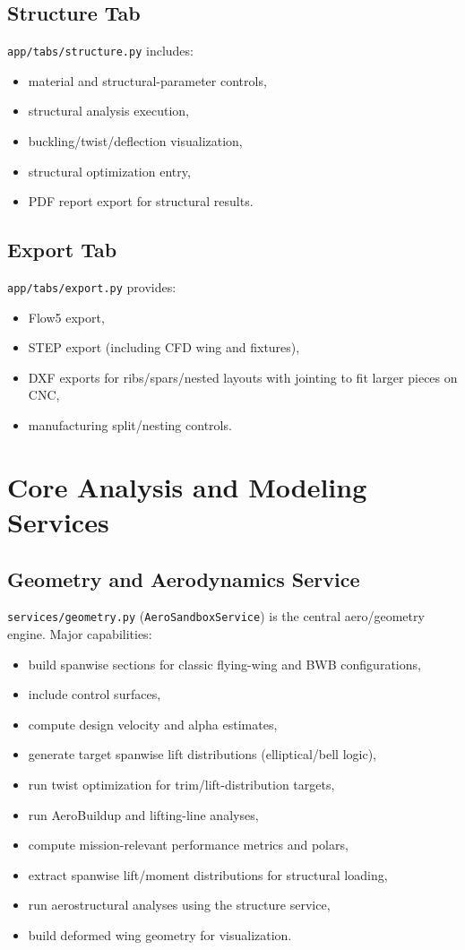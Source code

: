 ﻿\documentclass[11pt]{article}
\begin{document}
\subsection{Structure Tab}
\texttt{app/tabs/structure.py} includes:
\begin{itemize}
\item material and structural-parameter controls,
\item structural analysis execution,
\item buckling/twist/deflection visualization,
\item structural optimization entry,
\item PDF report export for structural results.
\end{itemize}

\subsection{Export Tab}
\texttt{app/tabs/export.py} provides:
\begin{itemize}
\item Flow5 export,
\item STEP export (including CFD wing and fixtures),
\item DXF exports for ribs/spars/nested layouts with jointing to fit larger pieces on CNC,
\item manufacturing split/nesting controls.
\end{itemize}

\section{Core Analysis and Modeling Services}
\subsection{Geometry and Aerodynamics Service}
\texttt{services/geometry.py} (\texttt{AeroSandboxService}) is the central aero/geometry engine. Major capabilities:
\begin{itemize}
\item build spanwise sections for classic flying-wing and BWB configurations,
\item include control surfaces,
\item compute design velocity and alpha estimates,
\item generate target spanwise lift distributions (elliptical/bell logic),
\item run twist optimization for trim/lift-distribution targets,
\item run AeroBuildup and lifting-line analyses,
\item compute mission-relevant performance metrics and polars,
\item extract spanwise lift/moment distributions for structural loading,
\item run aerostructural analyses using the structure service,
\item build deformed wing geometry for visualization.
\end{itemize}
\end{document}
